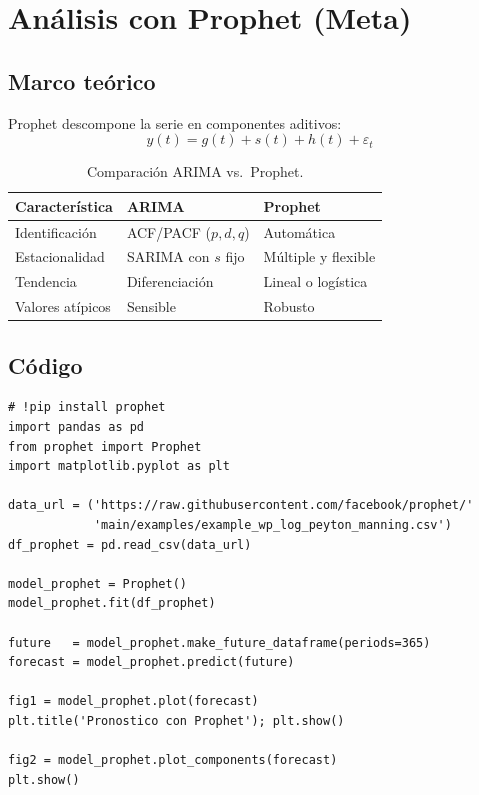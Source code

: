 \documentclass[12pt,letterpaper]{article}
\begin{document}
\section{An\'alisis con Prophet (Meta)}

\subsection{Marco te\'orico}

Prophet descompone la serie en componentes aditivos:
\begin{equation}
  y(t) = g(t) + s(t) + h(t) + \varepsilon_t
\end{equation}

\begin{table}[h!]
\centering
\begin{tabular}{@{}lll@{}}
\toprule
Caracter\'istica & ARIMA & Prophet \\
\midrule
Identificaci\'on  & ACF/PACF ($p,d,q$) & Autom\'atica \\
Estacionalidad    & SARIMA con $s$ fijo & M\'ultiple y flexible \\
Tendencia         & Diferenciaci\'on    & Lineal o log\'istica \\
Valores at\'ipicos & Sensible           & Robusto \\
\bottomrule
\end{tabular}
\caption{Comparaci\'on ARIMA vs.\ Prophet.}
\end{table}

\subsection{C\'odigo}

\begin{lstlisting}[style=python, caption={Ajuste y pron\'ostico con Prophet}]
# !pip install prophet
import pandas as pd
from prophet import Prophet
import matplotlib.pyplot as plt

data_url = ('https://raw.githubusercontent.com/facebook/prophet/'
            'main/examples/example_wp_log_peyton_manning.csv')
df_prophet = pd.read_csv(data_url)

model_prophet = Prophet()
model_prophet.fit(df_prophet)

future   = model_prophet.make_future_dataframe(periods=365)
forecast = model_prophet.predict(future)

fig1 = model_prophet.plot(forecast)
plt.title('Pronostico con Prophet'); plt.show()

fig2 = model_prophet.plot_components(forecast)
plt.show()
\end{lstlisting}
\end{document}
